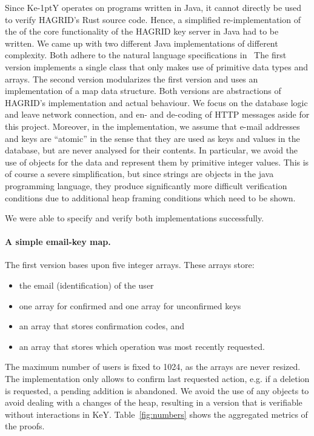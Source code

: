 \documentclass{llncs}
\newcommand{\KeY}{Ke\kern-1ptY\xspace}
\begin{document}
Since \KeY operates on programs written in Java, it cannot directly be
used to verify HAGRID's Rust source code. Hence, a simplified
re-implementation of the of the core functionality of the HAGRID key
server in Java had to be written.
%
We came up with two different Java implementations of different
complexity.
%
Both adhere to the natural language specifications in~\cite{LTC-dok}
%
The first version implements a single class that only
makes use of primitive data types and arrays. The second version
modularizes the first version and uses an implementation of a map data
structure. Both versions are abstractions of HAGRID's implementation
and actual behaviour. We focus on the database logic and leave network
connection, and en- and de-coding of HTTP messages aside for this
project. 
%
Moreover, in the implementation, we assume that e-mail addresses and
keys are ``atomic'' in the sense that they are used as keys and values
in the database, but are never analysed for their contents. In
particular, we avoid the use of objects for the data and represent
them by primitive integer values.
%
This is of course a severe simplification, but since strings are
objects in the java programming language, they produce significantly
more difficult verification conditions due to additional heap framing
conditions which need to be shown.

We were able to specify and verify both implementations successfully.

\paragraph{A simple email-key map.}
%
The first version bases upon five integer arrays.
These arrays store:
%
\begin{itemize}
  \item the email (identification) of the user
  \item one array for confirmed and one array for unconfirmed keys
  \item an array that stores confirmation codes, and
  \item an array that stores which operation was most recently requested.
\end{itemize}
%
The maximum number of users is fixed to 1024, as the arrays are never resized.
The implementation only allows to confirm last requested action, e.g. if a
deletion is requested, a pending addition is abandoned.
%
We avoid the use of any objects to avoid dealing with a changes of the heap,
resulting in a version that is verifiable without interactions in KeY. 
Table~\ref{fig:numbers} shows the aggregated metrics of the proofs.
\end{document}
